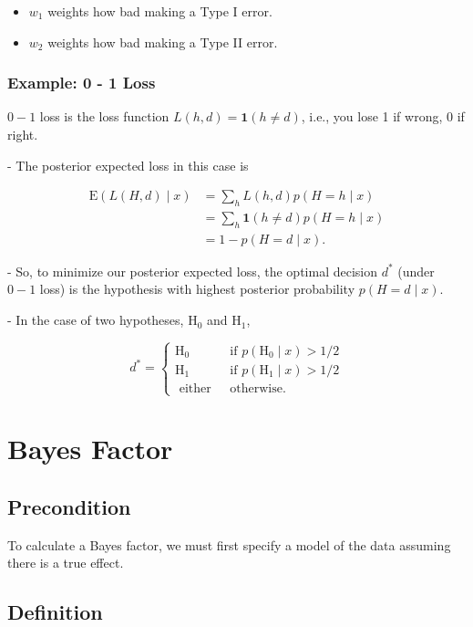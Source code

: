 \documentclass[11pt]{article}
\begin{document}
\begin{itemize}
    \item $w_{1}$ weights how bad making a Type I error.
    \item $w_{2}$ weights how bad making a Type II error.
\end{itemize}

\subsubsection{Example: 0 - 1 Loss}

$0-1$ loss is the loss function $L(h, d)=\mathbf{1}(h \neq d)$, i.e., you lose 1 if wrong, 0 if right.

- The posterior expected loss in this case is

$$
\begin{aligned}
\mathrm{E}(L(H, d) \mid x) &=\sum_{h} L(h, d) p(H=h \mid x) \\
&=\sum_{h} \mathbf{1}(h \neq d) p(H=h \mid x) \\
&=1-p(H=d \mid x) .
\end{aligned}
$$

- So, to minimize our posterior expected loss, the optimal decision $d^{*}$ (under $0-1$ loss) is the hypothesis with highest posterior probability $p(H=d \mid x)$.

- In the case of two hypotheses, $\mathrm{H}_{0}$ and $\mathrm{H}_{1}$,

$$
d^{*}= \begin{cases}
\mathrm{H}_{0} & \text { if } p\left(\mathrm{H}_{0} \mid x\right)>1 / 2 \\ 
\mathrm{H}_{1} & \text { if } p\left(\mathrm{H}_{1} \mid x\right)>1 / 2 \\ 
\text { either } & \text { otherwise. }\end{cases}
$$

\section{Bayes Factor}

\subsection{Precondition}
To calculate a Bayes factor, we must first specify a model of the data assuming there is a true effect. \cite{10.1093/geronb/gby065}

\subsection{Definition}
\end{document}
